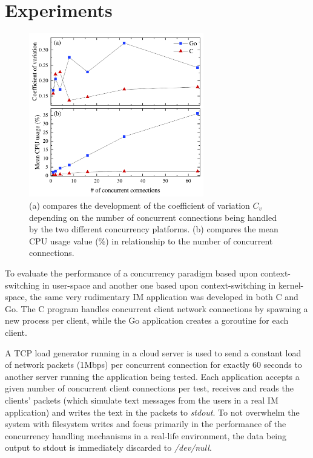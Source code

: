 \section{Experiments}
\begin{figure}[!t]
	\centering
	\includegraphics[width=3in]{img/combined_graph.pdf}
	\caption{(a) compares the development of the coefficient of variation $C_v$ depending on the number of concurrent connections being handled by the two different concurrency platforms. (b) compares the mean CPU usage value (\%) in relationship to the number of concurrent connections.}
	\label{fig_results}
\end{figure}
To evaluate the performance of a concurrency paradigm based upon context-switching in user-space and another one based upon context-switching in kernel-space, the same very rudimentary IM application was developed in both C and Go. The C program handles concurrent client network connections by spawning a new process per client, while the Go application creates a goroutine for each client. 

A TCP load generator running in a cloud server is used to send a constant load of network packets (1Mbps) per concurrent connection for exactly 60 seconds to another server running the application being tested. Each application accepts a given number of concurrent client connections per test, receives and reads the clients' packets (which simulate text messages from the users in a real IM application) and writes the text in the packets to \textit{stdout}. To not overwhelm the system with filesystem writes and focus primarily in the performance of the concurrency handling mechanisms in a real-life environment, the data being output to stdout is immediately discarded to \textit{/dev/null}. 

